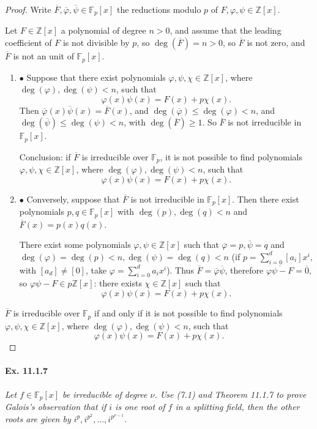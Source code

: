 \documentclass[11pt,a4paper]{article}
\newcommand{\be} {\begin{enumerate}}
\newcommand{\ee} {\end{enumerate}}
\newcommand{\Z}{\mathbb{Z}}
\newcommand{\F}{\mathbb{F}}
\begin{document}
\begin{proof}
Write $\overline{F},\overline{\varphi}, \overline{\psi} \in \F_p[x]$ the reductions modulo $p$ of $F,\varphi,\psi \in \Z[x]$. 

Let $F \in \Z[x]$ a polynomial of degree $n>0$, and assume that the leading coefficient of $F$ is not divisible by $p$, so $\deg(\overline{F}) = n>0$, so $\overline{F}$ is not zero, and 
$\overline{F}$ is not an unit of $\F_p[x]$.
\be
\item[$\bullet$] Suppose that there exist polynomials $\varphi,\psi,\chi \in \Z[x]$, where $\deg(\varphi),\deg(\psi) < n$, such that
$$\varphi(x) \psi(x) = F(x) + p \chi(x).$$
Then $\overline{\varphi}(x) \overline{\psi}(x) = \overline{F}(x)$, and $\deg(\overline{\varphi}) \leq \deg(\varphi) < n$, and $\deg(\overline{\psi}) \leq \deg(\psi) < n$, with $\deg(\overline{F})\geq 1$. So $\overline{F}$ is not irreducible in $\F_p[x]$. 

Conclusion: if $\overline{F}$ is irreducible over $\F_p$, it is not possible to find polynomials $\varphi,\psi,\chi \in \Z[x]$, where $\deg(\varphi),\deg(\psi) < n$, such that
$$\varphi(x) \psi(x) = F(x) + p \chi(x).$$

\item[$\bullet$]  Conversely, suppose that $\overline{F}$ is not irreducible in $\F_p[x]$. Then there exist polynomials $p,q \in \F_p[x]$ with $\deg(p),\deg(q)<n$ and $\overline{F}(x) = p(x)q(x)$.

There exist some polynomials $\varphi, \psi \in \Z[x]$ such that $\overline{\varphi} = p, \overline{\psi} = q$ and $\deg(\varphi) = \deg(p) < n, \deg(\psi) = \deg(q)<n$ (if $p = \sum_{i=0}^d [a_i] x^i$, with $[a_d] \ne [0]$, take $\varphi = \sum_{i=0}^d a_i x^i$). Thus $\overline{F} = \overline{\varphi} \overline{\psi} $, therefore $\overline{\varphi \psi-F} = \overline{0}$, so $ \varphi \psi -F \in p \Z[x]$: there exists $\chi \in \Z[x]$ such that
$$\varphi(x) \psi(x) = F(x) + p \chi(x).$$
\ee

$\overline{F}$ is irreducible over $\F_p$ if and only if it is not possible to find polynomials $\varphi,\psi,\chi \in \Z[x]$, where $\deg(\varphi),\deg(\psi) < n$, such that
$$\varphi(x) \psi(x) = F(x) + p \chi(x).$$
\end{proof}

\paragraph{Ex. 11.1.7}

{\it Let $f \in \F_p[x]$ be irreducible of degree $\nu$. Use (7.1) and Theorem 11.1.7 to prove Galois's observation that if $i$ is one root of $f$ in a splitting field, then the other roots are given by $i^p,i^{p^2},\ldots,i^{p^{\nu-1}}$.
}
\end{document}
